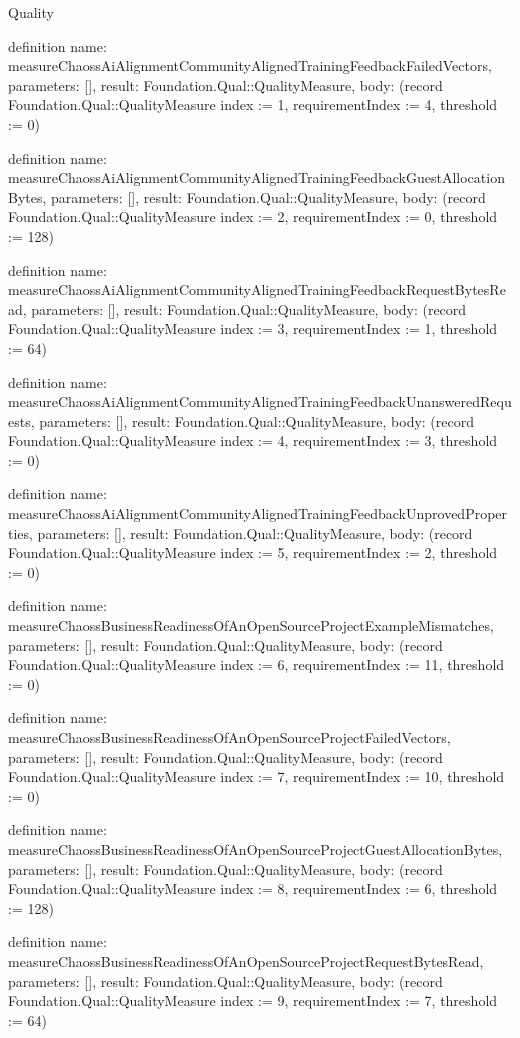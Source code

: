 \begin{lexlean}{Quality}
\begin{semanticmodule}
definition{
  name: measureChaossAiAlignmentCommunityAlignedTrainingFeedbackFailedVectors,
  parameters: [],
  result: Foundation.Qual::QualityMeasure,
  body: (record Foundation.Qual::QualityMeasure {index := 1, requirementIndex := 4, threshold := 0})
}

definition{
  name: measureChaossAiAlignmentCommunityAlignedTrainingFeedbackGuestAllocationBytes,
  parameters: [],
  result: Foundation.Qual::QualityMeasure,
  body: (record Foundation.Qual::QualityMeasure {index := 2, requirementIndex := 0, threshold := 128})
}

definition{
  name: measureChaossAiAlignmentCommunityAlignedTrainingFeedbackRequestBytesRead,
  parameters: [],
  result: Foundation.Qual::QualityMeasure,
  body: (record Foundation.Qual::QualityMeasure {index := 3, requirementIndex := 1, threshold := 64})
}

definition{
  name: measureChaossAiAlignmentCommunityAlignedTrainingFeedbackUnansweredRequests,
  parameters: [],
  result: Foundation.Qual::QualityMeasure,
  body: (record Foundation.Qual::QualityMeasure {index := 4, requirementIndex := 3, threshold := 0})
}

definition{
  name: measureChaossAiAlignmentCommunityAlignedTrainingFeedbackUnprovedProperties,
  parameters: [],
  result: Foundation.Qual::QualityMeasure,
  body: (record Foundation.Qual::QualityMeasure {index := 5, requirementIndex := 2, threshold := 0})
}

definition{
  name: measureChaossBusinessReadinessOfAnOpenSourceProjectExampleMismatches,
  parameters: [],
  result: Foundation.Qual::QualityMeasure,
  body: (record Foundation.Qual::QualityMeasure {index := 6, requirementIndex := 11, threshold := 0})
}

definition{
  name: measureChaossBusinessReadinessOfAnOpenSourceProjectFailedVectors,
  parameters: [],
  result: Foundation.Qual::QualityMeasure,
  body: (record Foundation.Qual::QualityMeasure {index := 7, requirementIndex := 10, threshold := 0})
}

definition{
  name: measureChaossBusinessReadinessOfAnOpenSourceProjectGuestAllocationBytes,
  parameters: [],
  result: Foundation.Qual::QualityMeasure,
  body: (record Foundation.Qual::QualityMeasure {index := 8, requirementIndex := 6, threshold := 128})
}

definition{
  name: measureChaossBusinessReadinessOfAnOpenSourceProjectRequestBytesRead,
  parameters: [],
  result: Foundation.Qual::QualityMeasure,
  body: (record Foundation.Qual::QualityMeasure {index := 9, requirementIndex := 7, threshold := 64})
}


\end{semanticmodule}
\end{lexlean}
